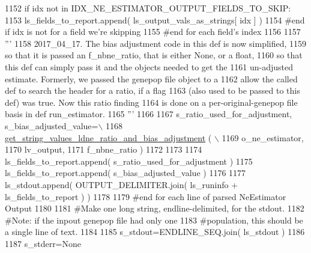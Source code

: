 \begin{DoxyCode}
1152                 \textcolor{keywordflow}{if} idx \textcolor{keywordflow}{not} \textcolor{keywordflow}{in} IDX\_NE\_ESTIMATOR\_OUTPUT\_FIELDS\_TO\_SKIP:
1153                     ls\_fields\_to\_report.append( ls\_output\_vals\_as\_strings[ idx ] )
1154                 \textcolor{comment}{#end if idx is not for a field we're skipping}
1155             \textcolor{comment}{#end for each field's index}
1156 
1157             \textcolor{stringliteral}{'''}
1158 \textcolor{stringliteral}{            2017\_04\_17.  The bias adjustment code in this def is now simplified,}
1159 \textcolor{stringliteral}{            so that it is passed an f\_nbne\_ratio, that is either None, or a float,}
1160 \textcolor{stringliteral}{            so that this def can simply pass it and the objects needed to get the}
1161 \textcolor{stringliteral}{            un-adjusted estimate.  Formerly, we passed the genepop file object to a}
1162 \textcolor{stringliteral}{            allow the called def to search  the header for a ratio, if a flag}
1163 \textcolor{stringliteral}{            (also used to be passed to this def) was true.  Now this ratio finding}
1164 \textcolor{stringliteral}{            is done on a per-original-genepop file basis in def run\_estimator.}
1165 \textcolor{stringliteral}{            '''}
1166 
1167             s\_ratio\_used\_for\_adjustment, s\_bias\_adjusted\_value=\(\backslash\)
1168                         \hyperlink{namespacenegui_1_1pgdriveneestimator_a7df54bcca5c33c80e648c440527a85ce}{get\_string\_values\_ldne\_ratio\_and\_bias\_adjustment}
      ( \(\backslash\)
1169                                                                 o\_ne\_estimator,
1170                                                                 lv\_output,
1171                                                                 f\_nbne\_ratio )
1172 
1173             
1174             ls\_fields\_to\_report.append( s\_ratio\_used\_for\_adjustment )
1175             ls\_fields\_to\_report.append( s\_bias\_adjusted\_value )
1176 
1177             ls\_stdout.append( OUTPUT\_DELIMITER.join(  ls\_runinfo + ls\_fields\_to\_report )  )
1178 
1179         \textcolor{comment}{#end for each line of parsed NeEstimator Output}
1180         
1181         \textcolor{comment}{#Make one long string, endline-delimited, for the stdout.}
1182         \textcolor{comment}{#Note:  if the inpout genepop file had only one}
1183         \textcolor{comment}{#population, this should be a single line of text.}
1184 
1185         s\_stdout=ENDLINE\_SEQ.join( ls\_stdout )
1186 
1187         s\_stderr=\textcolor{keywordtype}{None}

\end{DoxyCode}
